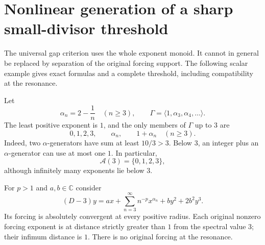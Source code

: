 \documentclass[11pt,a4paper]{article}
\numberwithin{equation}{section}
\theoremstyle{definition}
\theoremstyle{remark}
\newcommand{\C}{\mathbb C}
\newcommand{\G}{\Gamma}
\newcommand{\Anc}{\mathcal A}
\begin{document}
\section{Nonlinear generation of a sharp small-divisor threshold}
\label{sec:hidden}

The universal gap criterion uses the whole exponent monoid. It cannot in
general be replaced by separation of the original forcing support. The
following scalar example gives exact formulas and a complete threshold,
including compatibility at the resonance.

Let
\begin{equation}\label{eq:hidden-support}
 \alpha_n=2-\frac1n\quad(n\geq3),\qquad
 \G=\langle1,\alpha_3,\alpha_4,\ldots\rangle.
\end{equation}
The least positive exponent is $1$, and the only members of $\G$ up to
$3$ are
\begin{equation}\label{eq:window-support}
 0,1,2,3,\qquad \alpha_n,\qquad 1+\alpha_n\quad(n\geq3).
\end{equation}
Indeed, two $\alpha$-generators have sum at least $10/3>3$.
Below $3$, an integer plus an $\alpha$-generator can use at most one $1$.
In particular,
\begin{equation}\label{eq:hidden-ancestry}
 \Anc(3)=\{0,1,2,3\},
\end{equation}
although infinitely many exponents lie below $3$.

For $p>1$ and $a,b\in\C$ consider
\begin{equation}\label{eq:hidden-system}
 (D-3)y=a x+\sum_{n=3}^{\infty}n^{-p}x^{\alpha_n}
                  +b y^2+2b^2y^3.
\end{equation}
Its forcing is absolutely convergent at every positive radius.
Each original nonzero forcing exponent is at distance strictly greater
than $1$ from the spectral value $3$; their infimum distance is $1$.
There is no original forcing at the resonance.
\end{document}
